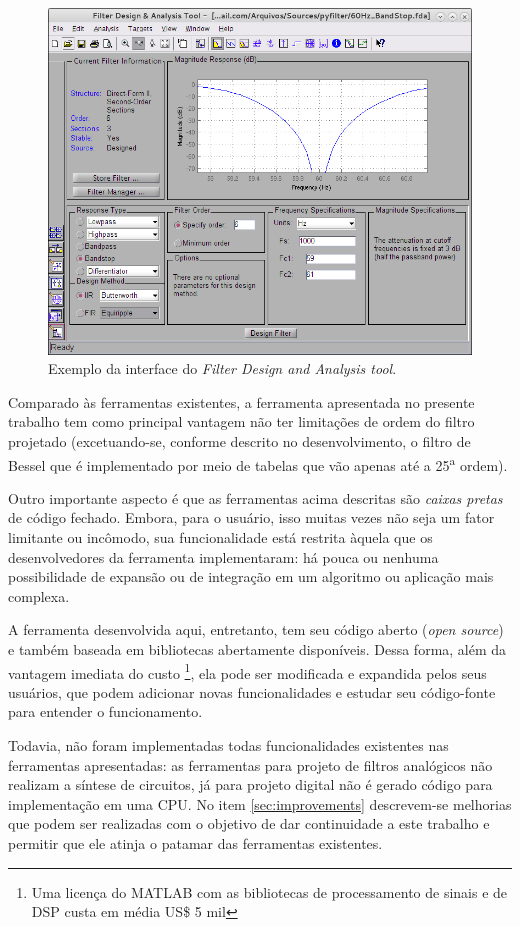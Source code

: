 \begin{figure}[H] 
\centering \includegraphics[scale=0.5]{images/screens/fdatool_example} \caption{Exemplo da interface do \textit{Filter Design and Analysis tool}.} 
\label{fig:fda_example} 
\end{figure}

Comparado às ferramentas existentes, a ferramenta apresentada no presente trabalho tem como principal vantagem não ter limitações de ordem do filtro projetado (excetuando-se, conforme descrito no desenvolvimento, o filtro de Bessel que é implementado por meio de tabelas que vão apenas até a 25\textsuperscript{a} ordem).

Outro importante aspecto é que as ferramentas acima descritas são \textit{caixas pretas} de código fechado. Embora, para o usuário, isso muitas vezes não seja um fator limitante ou incômodo, sua funcionalidade está restrita àquela que os desenvolvedores da ferramenta implementaram: há pouca ou nenhuma possibilidade de expansão ou de integração em um algoritmo ou aplicação mais complexa.

A ferramenta desenvolvida aqui, entretanto, tem seu código aberto (\textit{open source}) e também baseada em bibliotecas abertamente disponíveis. Dessa forma, além da vantagem imediata do custo \footnote{Uma licença do MATLAB com as bibliotecas de processamento de sinais e de DSP custa em média US\$ 5 mil}, ela pode ser modificada e expandida pelos seus usuários, que podem adicionar novas funcionalidades e estudar seu código-fonte para entender o funcionamento.

Todavia, não foram implementadas todas funcionalidades existentes nas ferramentas apresentadas: as ferramentas para projeto de filtros analógicos não realizam a síntese de circuitos, já para projeto digital não é gerado código para implementação em uma CPU. No item \ref{sec:improvements} descrevem-se melhorias que podem ser realizadas com o objetivo de dar continuidade a este trabalho e permitir que ele atinja o patamar das ferramentas existentes.